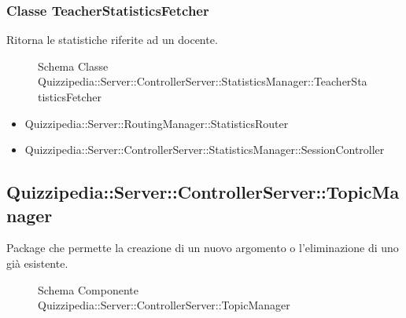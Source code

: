 \subsubsection{Classe TeacherStatisticsFetcher}
Ritorna le statistiche riferite ad un docente.
\begin{figure}[H]
\centering
\noindent{}
\caption[Schema Classe TeacherStatisticsFetcher]{Schema Classe Quizzipedia::Server::ControllerServer::StatisticsManager::TeacherStatisticsFetcher}
\end{figure}
\begin{itemize}
\item Quizzipedia::Server::RoutingManager::StatisticsRouter
\end{itemize}
\begin{itemize}
\item Quizzipedia::Server::ControllerServer::StatisticsManager::SessionController
\end{itemize}
\subsection{Quizzipedia::Server::ControllerServer::TopicManager}
Package che permette la creazione di un nuovo argomento o l'eliminazione di uno già esistente.
\begin{figure}[H]
\centering
\noindent{}
\caption[Schema Componente Quizzipedia::Server::ControllerServer::TopicManager]{Schema Componente Quizzipedia::Server::ControllerServer::TopicManager}
\end{figure}
